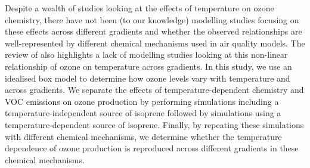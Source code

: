 Despite a wealth of studies looking at the effects of temperature on ozone chemistry, there have not been (to our knowledge) modelling studies focusing on these effects across different  gradients and whether the observed relationships are well-represented by different chemical mechanisms used in air quality models.
The review of \citet{Pusede:2015} also highlights a lack of modelling studies looking at this non-linear relationship of ozone on temperature across  gradients.
In this study, we use an idealised box model to determine how ozone levels vary with temperature and across  gradients.
We separate the effects of temperature-dependent chemistry and VOC emissions on ozone production by performing simulations including a temperature-independent source of isoprene followed by simulations using a temperature-dependent source of isoprene. 
Finally, by repeating these simulations with different chemical mechanisms, we determine whether the temperature dependence of ozone production is reproduced across different  gradients in these chemical mechanisms.